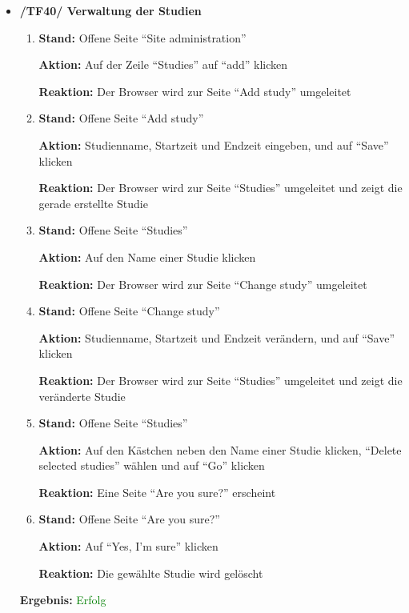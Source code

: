 \documentclass[a4paper]{scrreprt}
\begin{document}
\begin{itemize}
                \item \textbf{/TF40/ Verwaltung der Studien}
                    \begin{enumerate}
                        \item \par \textbf{Stand: }Offene Seite ``Site administration''
                              \par \textbf{Aktion: }Auf der Zeile ``Studies'' auf ``add'' klicken
                              \par \textbf{Reaktion: }Der Browser wird zur Seite ``Add study'' umgeleitet
                        \item \par \textbf{Stand: }Offene Seite ``Add study''
                              \par \textbf{Aktion: }Studienname, Startzeit und Endzeit eingeben, und auf ``Save'' klicken
                              \par \textbf{Reaktion: }Der Browser wird zur Seite ``Studies'' umgeleitet und zeigt die gerade erstellte Studie
                        \item \par \textbf{Stand: }Offene Seite ``Studies''
                              \par \textbf{Aktion: }Auf den Name einer Studie klicken
                              \par \textbf{Reaktion: }Der Browser wird zur Seite ``Change study'' umgeleitet
                        \item \par \textbf{Stand: }Offene Seite ``Change study''
                              \par \textbf{Aktion: }Studienname, Startzeit und Endzeit ver\"andern, und auf ``Save'' klicken
                              \par \textbf{Reaktion: }Der Browser wird zur Seite ``Studies'' umgeleitet und zeigt die ver\"anderte Studie
                        \item \par \textbf{Stand: }Offene Seite ``Studies''
                              \par \textbf{Aktion: }Auf den K\"astchen neben den Name einer Studie klicken, ``Delete selected studies'' w\"ahlen und auf ``Go'' klicken
                              \par \textbf{Reaktion: }Eine Seite ``Are you sure?'' erscheint
						\item \par \textbf{Stand: }Offene Seite ``Are you sure?''
                              \par \textbf{Aktion: }Auf ``Yes, I'm sure'' klicken
                              \par \textbf{Reaktion: }Die gew\"ahlte Studie wird gel\"oscht
                    \end{enumerate}
					\vspace*{0.3cm}
		           \par \textbf{Ergebnis: }\textcolor{green}{Erfolg}
		           \vspace*{0.6cm}
		

\end{itemize}
\end{document}
